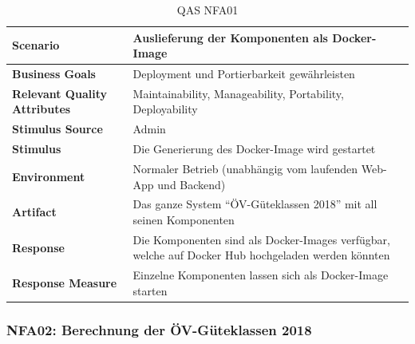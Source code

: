 \begin{table}[H]
    \begin{tabular}{l p{10.6cm}}
        \toprule
        \textbf{Scenario}
                                & Auslieferung der Komponenten als Docker-Image\\
        \midrule
        \textbf{Business Goals}
                                & Deployment und Portierbarkeit gewährleisten \\
        \textbf{Relevant Quality Attributes}
                                & Maintainability, Manageability, Portability, Deployability\\
        \textbf{Stimulus Source}
                                & Admin\\
        \textbf{Stimulus}
                                & Die Generierung des Docker-Image wird gestartet\\
        \textbf{Environment}
                                & Normaler Betrieb (unabhängig vom laufenden Web-App und Backend)\\
        \textbf{Artifact}
                                & Das ganze System "`ÖV-Güteklassen 2018"' mit all seinen Komponenten\\
        \textbf{Response}
                                & Die Komponenten sind als Docker-Images verfügbar, welche auf Docker Hub hochgeladen werden könnten\\  
        \textbf{Response Measure}
                                & Einzelne Komponenten lassen sich als Docker-Image starten\\
                                
        \bottomrule
    \end{tabular}
    \caption{QAS NFA01}
    \label{table:nfa01}
\end{table}

\subsubsection{NFA02: Berechnung der ÖV-Güteklassen 2018}
\label{NFA:NFA02}

